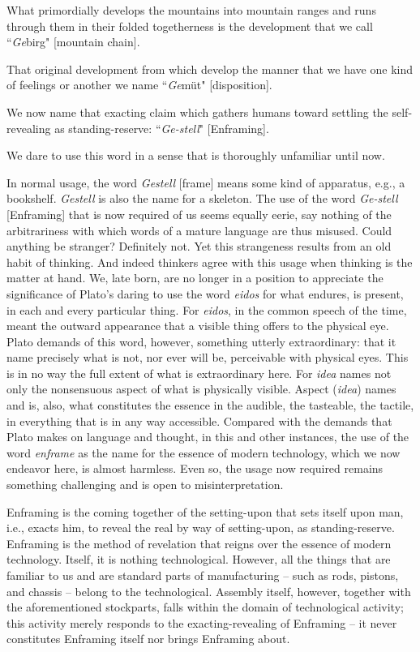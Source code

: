 \documentclass[paper=a4, fontsize=11pt,twoside]{scrartcl}
\begin{document}
What primordially develops the mountains into mountain ranges and runs through them in their folded togetherness is the development that we call ``\textit{Ge}birg" [mountain chain].

That original development from which develop the manner that we have one kind of feelings or another we name ``\textit{Ge}m{\"u}t" [disposition].

We now name that exacting claim which gathers humans toward settling the self-revealing as standing-reserve: ``\textit{Ge-stell}" [Enframing].

We dare to use this word in a sense that is thoroughly unfamiliar until now.

In normal usage, the word \textit{Gestell} [frame] means some kind of apparatus, e.g., a bookshelf. \textit{Gestell} is also the name for a skeleton. The use of the word \textit{Ge-stell} [Enframing] that is now required of us seems equally eerie, say nothing of the arbitrariness with which words of a mature language are thus misused. Could anything be stranger? Definitely not. Yet this strangeness results from an old habit of thinking. And indeed thinkers agree with this usage when thinking is the matter at hand.  We, late born, are no longer in a position to appreciate the significance of Plato's daring to use the word \textit{eidos} for what endures, is present, in each and every particular thing. For \textit{eidos}, in the common speech of the time, meant the outward appearance that a visible thing offers to the physical eye. Plato demands of this word, however, something utterly extraordinary: that it name precisely what is not, nor ever will be, perceivable with physical eyes. This is in no way the full extent of what is extraordinary here. For \textit{idea} names not only the nonsensuous aspect of what is physically visible. Aspect (\textit{idea}) names and is, also, what constitutes the essence in the audible, the tasteable, the tactile, in everything that is in any way accessible. Compared with the demands that Plato makes on language and thought, in this and other instances, the use of the word \textit{enframe} as the name for the essence of modern technology, which we now endeavor here, is almost harmless. Even so, the usage now required remains something challenging and is open to misinterpretation.

Enframing is the coming together of the setting-upon that sets itself upon man, i.e., exacts him, to reveal the real by way of setting-upon, as standing-reserve. Enframing is the method of revelation that reigns over the essence of modern technology. Itself, it is nothing technological. However, all the things that are familiar to us and are standard parts of manufacturing -- such as rods, pistons, and chassis -- belong to the technological. Assembly itself, however, together with the aforementioned stockparts, falls within the domain of technological activity; this activity merely responds to the exacting-revealing of Enframing -- it never constitutes Enframing itself nor brings Enframing about.
\end{document}
